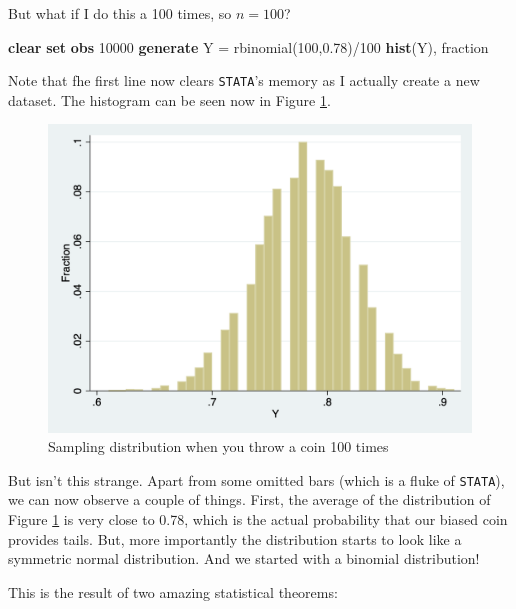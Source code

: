 \documentclass[
]{book}
\newenvironment{Shaded}{\begin{snugshade}}{\end{snugshade}}
\newcommand{\KeywordTok}[1]{\textcolor[rgb]{0.13,0.29,0.53}{\textbf{#1}}}
\newcommand{\NormalTok}[1]{#1}
\begin{document}
But what if I do this a 100 times, so \(n = 100\)?

\begin{Shaded}
\begin{Highlighting}[]
\KeywordTok{clear}
\KeywordTok{set} \KeywordTok{obs}\NormalTok{ 10000}
\KeywordTok{generate}\NormalTok{ Y = rbinomial(100,0.78)/100 }
\KeywordTok{hist}\NormalTok{(Y), fraction}
\end{Highlighting}
\end{Shaded}

Note that fhe first line now clears \texttt{STATA}'s memory as I actually create a new dataset. The histogram can be seen now in Figure \ref{fig:coin100}.

\begin{figure}
\includegraphics[width=18.33in]{./figures/coin100} \caption{Sampling distribution when you throw a coin 100 times}\label{fig:coin100}
\end{figure}

But isn't this strange. Apart from some omitted bars (which is a fluke of \texttt{STATA}), we can now observe a couple of things. First, the average of the distribution of Figure \ref{fig:coin100} is very close to 0.78, which is the actual probability that our biased coin provides tails. But, more importantly the distribution starts to look like a symmetric normal distribution. And we started with a binomial distribution!

This is the result of two amazing statistical theorems:
\end{document}
